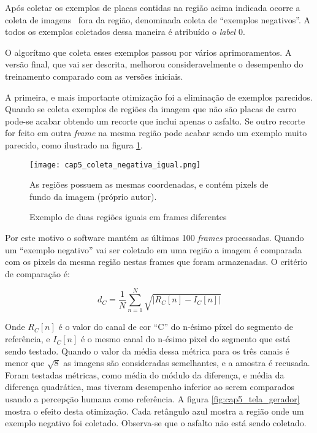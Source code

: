 Após coletar os exemplos de placas contidas na região acima indicada ocorre a
coleta de imagens  fora da região, denominada coleta de “exemplos negativos”. A
todos os exemplos coletados dessa maneira é atribuído o \emph{label} 0.

O algorítmo que coleta esses exemplos passou por vários aprimoramentos. A
versão final, que vai ser descrita, melhorou consideravelmente o desempenho do
treinamento comparado com as versões iniciais.

A primeira, e mais importante otimização foi a eliminação de exemplos
parecidos. Quando se coleta exemplos de regiões da imagem que não são placas de
carro pode-se acabar obtendo um recorte que inclui apenas o asfalto. Se outro
recorte for feito em outra \emph{frame} na mesma região pode acabar sendo
um exemplo muito parecido, como ilustrado na figura
\ref{fig:cap5_coleta_negativa_igual}.

\begin{figure}[!htb]
	\centering
	\texttt{[image: cap5\_coleta\_negativa\_igual.png]}
	\caption{Exemplo de duas regiões iguais em frames diferentes}
	\label{fig:cap5_coleta_negativa_igual}
	As regiões possuem as mesmas coordenadas, e contém pixels de fundo da
	imagem (próprio autor).
\end{figure}

Por este motivo o software mantém as últimas 100 \emph{frames} processadas.
Quando um “exemplo negativo” vai ser coletado em uma região a imagem é
comparada com os
pixels da mesma região nestas frames que foram armazenadas. O critério de
comparação é:

\begin{equation}
	d_C=\frac{1}{N} \sum_{n=1}^N \sqrt{\left| R_C [n] -I_C [n] \right|}
\end{equation}

Onde $R_C[n]$ é o valor do canal de cor “C” do n-ésimo píxel do segmento de
referência, e $I_C[n]$ é o mesmo canal do n-ésimo pixel do
segmento que está sendo testado. Quando o valor da média dessa métrica
para os três canais é menor que $\sqrt{8}$ as imagens são consideradas
semelhantes, e a amostra é recusada. Foram
testadas métricas, como média do módulo da diferença, e média da diferença
quadrática, mas tiveram desempenho inferior ao serem comparados usando a
percepção humana como referência. A figura
\ref{fig:cap5_tela_gerador} mostra o efeito desta otimização.
Cada retângulo azul mostra a região onde um exemplo negativo foi coletado.
Observa-se que o asfalto não está sendo coletado.

